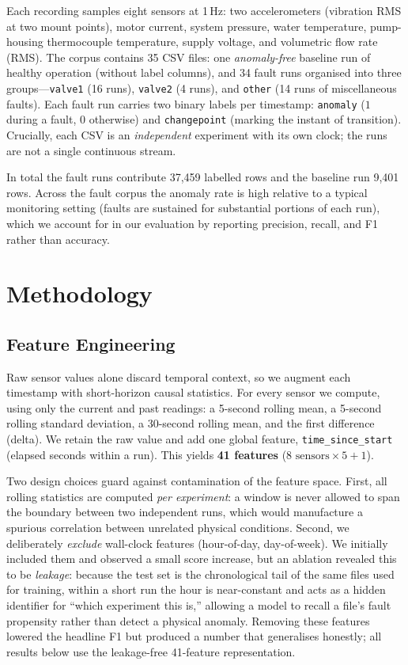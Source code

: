 \documentclass[conference]{IEEEtran}
\begin{document}
Each recording samples eight sensors at 1\,Hz: two accelerometers
(vibration RMS at two mount points), motor current, system pressure, water
temperature, pump-housing thermocouple temperature, supply voltage, and
volumetric flow rate (RMS). The corpus contains 35 CSV files: one
\emph{anomaly-free} baseline run of healthy operation (without label columns),
and 34 fault runs organised into three groups---\texttt{valve1} (16 runs),
\texttt{valve2} (4 runs), and \texttt{other} (14 runs of miscellaneous faults).
Each fault run carries two binary labels per timestamp: \texttt{anomaly}
($1$ during a fault, $0$ otherwise) and \texttt{changepoint} (marking the
instant of transition). Crucially, each CSV is an \emph{independent} experiment
with its own clock; the runs are not a single continuous stream.

In total the fault runs contribute 37{,}459 labelled rows and the baseline run
9{,}401 rows. Across the fault corpus the anomaly rate is high relative to a
typical monitoring setting (faults are sustained for substantial portions of
each run), which we account for in our evaluation by reporting precision,
recall, and F1 rather than accuracy.

\section{Methodology}
\label{sec:method}

\subsection{Feature Engineering}
Raw sensor values alone discard temporal context, so we augment each timestamp
with short-horizon causal statistics. For every sensor we compute, using only
the current and past readings: a 5-second rolling mean, a 5-second rolling
standard deviation, a 30-second rolling mean, and the first difference (delta).
We retain the raw value and add one global feature, \texttt{time\_since\_start}
(elapsed seconds within a run). This yields \textbf{41 features}
($8 \text{ sensors} \times 5 + 1$).

Two design choices guard against contamination of the feature space. First,
all rolling statistics are computed \emph{per experiment}: a window is never
allowed to span the boundary between two independent runs, which would
manufacture a spurious correlation between unrelated physical conditions.
Second, we deliberately \emph{exclude} wall-clock features (hour-of-day,
day-of-week). We initially included them and observed a small score increase,
but an ablation revealed this to be \emph{leakage}: because the test set is the
chronological tail of the same files used for training, within a short run the
hour is near-constant and acts as a hidden identifier for ``which experiment
this is,'' allowing a model to recall a file's fault propensity rather than
detect a physical anomaly. Removing these features lowered the headline F1 but
produced a number that generalises honestly; all results below use the
leakage-free 41-feature representation.
\end{document}
